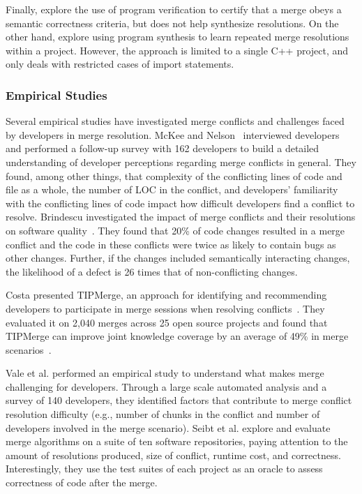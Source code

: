 Finally, \citet{Sousa18} explore the use of program verification to certify that a merge obeys a semantic correctness criteria, but does not help synthesize resolutions. 
On the other hand, \citet{pan-synthesis-2021} explore using program synthesis to learn repeated merge resolutions within a project. 
However, the approach is limited to a single C++ project, and only deals with restricted cases of import statements. 

\subsubsection{Empirical Studies}

Several empirical studies have investigated merge conflicts and challenges faced by developers in merge resolution. McKee \etal \cite{mckee2017software} and Nelson~\etal \cite{nelson2019life} interviewed developers and performed a follow-up survey with 162 developers to build a detailed understanding of developer perceptions regarding merge conflicts in general. They found, among other things, that complexity of the conflicting lines of code and file as a whole, the number of LOC in the conflict, and developers’ familiarity with the conflicting lines of code impact how difficult developers find a conflict to resolve.  %
Brindescu \etal investigated the impact of merge conflicts and their resolutions on software quality~\cite{brindescu2020lifting,brindescu2020empirical}.   They found that 20\% of code changes resulted in a merge conflict and the code in these conflicts were twice as likely to contain bugs as other changes. Further, if the changes included semantically interacting changes, the likelihood of a defect is 26 times that of non-conflicting changes.

Costa \etal presented TIPMerge, an approach for identifying and recommending developers to participate in merge sessions when resolving conflicts~\cite{costa2016tipmerge}. They  evaluated it on 2,040 merges across 25 open source projects and found that TIPMerge can improve joint knowledge coverage by an average of 49\% in merge scenarios~\cite{de2019recommending}.

Vale et al. \citep{vale2021challenges} performed an empirical study to understand what makes merge challenging for developers.  Through a large scale automated analysis and a survey of 140 developers, they identified factors that contribute to merge conflict resolution difficulty (e.g., number of chunks in the conflict and number of developers involved in the merge scenario).
Seibt et al. \citep{seibt2021leveraging} explore and evaluate merge algorithms on a suite of ten software repositories, paying attention to the amount of resolutions produced, size of conflict, runtime cost, and correctness. Interestingly, they use the test suites of each project as an oracle to assess correctness of code after the merge.

